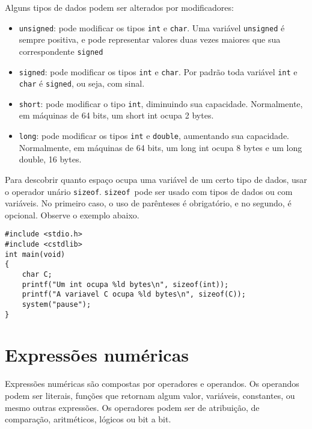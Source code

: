 \documentclass{book}
\newcommand{\SIZEOF}{{\tt sizeof}}
\begin{document}
Alguns tipos de dados podem ser alterados por modificadores:

\begin{itemize}
\item {\tt unsigned}: pode modificar os tipos {\tt int} e {\tt char}. Uma variável {\tt unsigned} é sempre positiva, e pode representar valores duas vezes maiores que sua correspondente {\tt signed}
\item {\tt signed}: pode modificar os tipos {\tt int} e {\tt char}. 
Por padrão toda variável {\tt int} e {\tt char} é {\tt signed}, ou seja, com sinal.
\item {\tt short}: pode modificar o tipo {\tt int}, diminuindo sua capacidade. Normalmente, em máquinas de 64 bits, um short int ocupa 2 bytes.
\item {\tt long}: pode modificar os tipos {\tt int} e {\tt double}, aumentando sua capacidade. Normalmente, em máquinas de 64 bits, um long int ocupa 8 bytes e um long double, 16 bytes.

\end{itemize}

Para descobrir quanto espaço ocupa uma variável de um certo tipo de dados, usar o operador unário \SIZEOF. \SIZEOF\ pode ser usado com tipos de dados ou com variáveis. No primeiro caso, o uso de parênteses é obrigatório, e no segundo, é opcional. Observe o exemplo abaixo.

\begin{lstlisting}
#include <stdio.h>
#include <cstdlib>
int main(void)
{
    char C;
    printf("Um int ocupa %ld bytes\n", sizeof(int));
    printf("A variavel C ocupa %ld bytes\n", sizeof(C));
    system("pause");
}
\end{lstlisting}





\section{Expressões numéricas}
\label{sec:expr}

Expressões numéricas são compostas por operadores e operandos. Os operandos podem ser literais, funções que retornam algum valor, variáveis, constantes, ou mesmo outras expressões. Os operadores podem ser de atribuição, de comparação, aritméticos, lógicos ou bit a bit.
\end{document}
